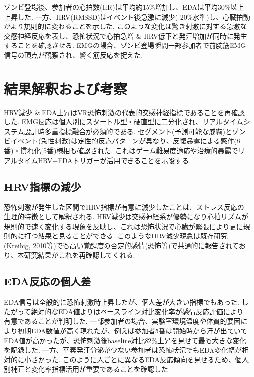 \documentclass[a4paper]{jarticle}
\begin{document}
ゾンビ登場後、参加者の心拍数(HR)は平均約15\%増加し、EDAは平均30\%以上上昇した. 一方、HRV(RMSSD)はイベント後急激に減少(-20\%水準)し、心臓拍動がより規則的に変わることを示した. このような変化は驚き刺激に対する急激な交感神経反応を表し、恐怖状況で心拍急増 \& HRV低下と発汗増加が同時に発生することを確認させる. EMGの場合、ゾンビ登場瞬間一部参加者で前腕筋EMG信号の頂点が観察され、驚く筋反応を捉えた.

\section{結果解釈および考察}%

HRV減少 \& EDA上昇はVR恐怖刺激の代表的交感神経指標であることを再確認した. EMG反応は個人別にスタートル型・硬直型に二分化され、リアルタイムシステム設計時多重指標融合が必須的である. セグメント(予測可能な威嚇)とゾンビイベント(急性刺激)は定性的反応パターンが異なり、反復暴露による感作(8番)・慣れ化(5番)様相も確認された. これはゲーム難易度適応や治療的暴露でリアルタイムHRV+EDAトリガーが活用できることを示唆する.

\subsection{HRV指標の減少}

恐怖刺激が発生した区間でHRV指標が有意に減少したことは、ストレス反応の生理的特徴として解釈される. HRV減少は交感神経系が優勢になり心拍リズムが規則的で速く変化する現象を反映し、これは恐怖状況で心臓が緊張により更に規則的に打つ結果と見ることができる. このようなHRV減少現象は既存研究(Kreibig, 2010等)でも高い覚醒度の否定的感情(恐怖等)で共通的に報告されており、本研究結果がこれを再確認してくれる.

\subsection{EDA反応の個人差}

EDA信号は全般的に恐怖刺激時上昇したが、個人差が大きい指標でもあった. したがって絶対的なEDA値よりはベースライン対比変化率が感情反応評価により有意であることが判明した. 一部参加者の場合、実験室環境温度や体質的要因により初期EDA数値が高く現れたが、例えば参加者5番は開始時から汗が出ていてEDA値が高かったが、恐怖刺激後baseline対比82\%上昇を見せて最も大きな変化を記録した. 一方、平素発汗分泌が少ない参加者は恐怖状況でもEDA変化幅が相対的に小さかった. このように人ごとに異なるEDA反応傾向を見せるため、個人別補正と変化率指標活用が重要であることを確認した.
\end{document}
